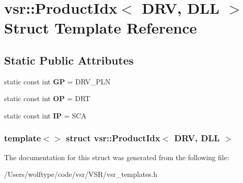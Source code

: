 \hypertarget{structvsr_1_1_product_idx_3_01_d_r_v_00_01_d_l_l_01_4}{\section{vsr\-:\-:Product\-Idx$<$ D\-R\-V, D\-L\-L $>$ Struct Template Reference}
\label{structvsr_1_1_product_idx_3_01_d_r_v_00_01_d_l_l_01_4}
}
\subsection*{Static Public Attributes}
\begin{DoxyCompactItemize}
\item 
\hypertarget{structvsr_1_1_product_idx_3_01_d_r_v_00_01_d_l_l_01_4_a2073eac5598c0836c24bae2707cc5398}{static const int {\bfseries G\-P} = D\-R\-V\-\_\-\-P\-L\-N}\label{structvsr_1_1_product_idx_3_01_d_r_v_00_01_d_l_l_01_4_a2073eac5598c0836c24bae2707cc5398}

\item 
\hypertarget{structvsr_1_1_product_idx_3_01_d_r_v_00_01_d_l_l_01_4_a6698d70a57acf1b5e985a4673d8bde3c}{static const int {\bfseries O\-P} = D\-R\-T}\label{structvsr_1_1_product_idx_3_01_d_r_v_00_01_d_l_l_01_4_a6698d70a57acf1b5e985a4673d8bde3c}

\item 
\hypertarget{structvsr_1_1_product_idx_3_01_d_r_v_00_01_d_l_l_01_4_ab57f022255c0e12fc6a3f43481df1eb8}{static const int {\bfseries I\-P} = S\-C\-A}\label{structvsr_1_1_product_idx_3_01_d_r_v_00_01_d_l_l_01_4_ab57f022255c0e12fc6a3f43481df1eb8}

\end{DoxyCompactItemize}
\subsubsection*{template$<$$>$ struct vsr\-::\-Product\-Idx$<$ D\-R\-V, D\-L\-L $>$}



The documentation for this struct was generated from the following file\-:\begin{DoxyCompactItemize}
\item 
/\-Users/wolftype/code/vsr/\-V\-S\-R/vsr\-\_\-templates.\-h\end{DoxyCompactItemize}
